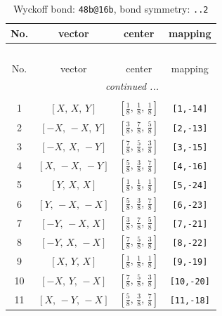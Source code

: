 \documentclass[fleqn,8pt]{jsarticle}
\begin{document}
\begin{longtable}{cccc}
\caption{Wyckoff bond: {\tt 48b@16b}, bond symmetry: {\tt ..2}}
 \\
 \hline \hline
No. & vector & center & mapping \\ \hline \endfirsthead

\multicolumn{3}{l}{\tablename\ \thetable{}} \\
 \hline \hline
No. & vector & center & mapping \\ \hline \endhead

 \hline \hline
\multicolumn{3}{r}{\footnotesize\it continued ...} \\ \endfoot

 \hline \hline
\multicolumn{3}{r}{} \\ \endlastfoot

1 & $\left[ X,\, X,\, Y \right]$ & $\left[ \frac{1}{8},\, \frac{1}{8},\, \frac{1}{8} \right]$ & {\tt [1,-14]} \\ \hline
2 & $\left[ - X,\, - X,\, Y \right]$ & $\left[ \frac{3}{8},\, \frac{7}{8},\, \frac{5}{8} \right]$ & {\tt [2,-13]} \\ \hline
3 & $\left[ - X,\, X,\, - Y \right]$ & $\left[ \frac{7}{8},\, \frac{5}{8},\, \frac{3}{8} \right]$ & {\tt [3,-15]} \\ \hline
4 & $\left[ X,\, - X,\, - Y \right]$ & $\left[ \frac{5}{8},\, \frac{3}{8},\, \frac{7}{8} \right]$ & {\tt [4,-16]} \\ \hline
5 & $\left[ Y,\, X,\, X \right]$ & $\left[ \frac{1}{8},\, \frac{1}{8},\, \frac{1}{8} \right]$ & {\tt [5,-24]} \\ \hline
6 & $\left[ Y,\, - X,\, - X \right]$ & $\left[ \frac{5}{8},\, \frac{3}{8},\, \frac{7}{8} \right]$ & {\tt [6,-23]} \\ \hline
7 & $\left[ - Y,\, - X,\, X \right]$ & $\left[ \frac{3}{8},\, \frac{7}{8},\, \frac{5}{8} \right]$ & {\tt [7,-21]} \\ \hline
8 & $\left[ - Y,\, X,\, - X \right]$ & $\left[ \frac{7}{8},\, \frac{5}{8},\, \frac{3}{8} \right]$ & {\tt [8,-22]} \\ \hline
9 & $\left[ X,\, Y,\, X \right]$ & $\left[ \frac{1}{8},\, \frac{1}{8},\, \frac{1}{8} \right]$ & {\tt [9,-19]} \\ \hline
10 & $\left[ - X,\, Y,\, - X \right]$ & $\left[ \frac{7}{8},\, \frac{5}{8},\, \frac{3}{8} \right]$ & {\tt [10,-20]} \\ \hline
11 & $\left[ X,\, - Y,\, - X \right]$ & $\left[ \frac{5}{8},\, \frac{3}{8},\, \frac{7}{8} \right]$ & {\tt [11,-18]} \\ \hline

\end{longtable}
\end{document}
